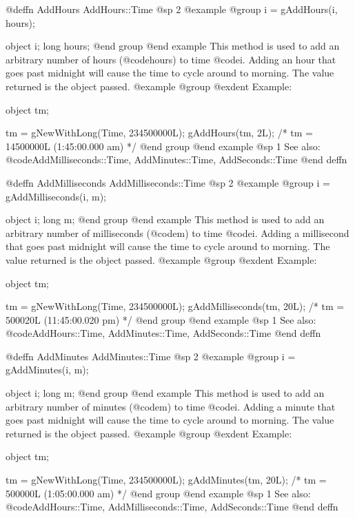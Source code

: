 @deffn {AddHours} AddHours::Time
@sp 2
@example
@group
i = gAddHours(i, hours);

object  i;
long    hours;
@end group
@end example
This method is used to add an arbitrary number of hours (@code{hours}) to
time @code{i}.  Adding an hour that goes past midnight will cause the time
to cycle around to morning.  The value returned is the object passed.
@example
@group
@exdent Example:

object  tm;

tm = gNewWithLong(Time, 234500000L);
gAddHours(tm, 2L);  /* tm = 14500000L (1:45:00.000 am) */
@end group
@end example
@sp 1
See also:  @code{AddMilliseconds::Time, AddMinutes::Time, AddSeconds::Time}
@end deffn








@deffn {AddMilliseconds} AddMilliseconds::Time
@sp 2
@example
@group
i = gAddMilliseconds(i, m);

object  i;
long    m;
@end group
@end example
This method is used to add an arbitrary number of milliseconds (@code{m}) to
time @code{i}.  Adding a millisecond that goes past midnight will cause the time
to cycle around to morning.  The value returned is the object passed.
@example
@group
@exdent Example:

object  tm;

tm = gNewWithLong(Time, 234500000L);
gAddMilliseconds(tm, 20L);
    /* tm = 500020L (11:45:00.020 pm) */
@end group
@end example
@sp 1
See also:  @code{AddHours::Time, AddMinutes::Time, AddSeconds::Time}
@end deffn











@deffn {AddMinutes} AddMinutes::Time
@sp 2
@example
@group
i = gAddMinutes(i, m);

object  i;
long    m;
@end group
@end example
This method is used to add an arbitrary number of minutes (@code{m}) to
time @code{i}.  Adding a minute that goes past midnight will cause the time
to cycle around to morning.  The value returned is the object passed.
@example
@group
@exdent Example:

object  tm;

tm = gNewWithLong(Time, 234500000L);
gAddMinutes(tm, 20L);  /* tm = 500000L (1:05:00.000 am) */
@end group
@end example
@sp 1
See also:  @code{AddHours::Time, AddMilliseconds::Time, AddSeconds::Time}
@end deffn











